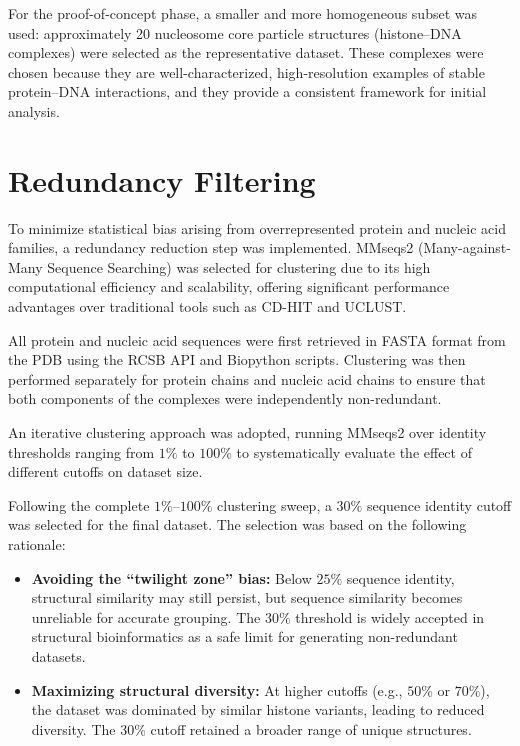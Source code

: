 \documentclass[12pt,a4paper]{report}
\begin{document}
For the proof-of-concept phase, a smaller and more homogeneous subset was used: approximately 20 nucleosome core particle structures (histone--DNA complexes) were selected as the representative dataset. These complexes were chosen because they are well-characterized, high-resolution examples of stable protein--DNA interactions, and they provide a consistent framework for initial analysis.

\newpage
\section*{Redundancy Filtering}


To minimize statistical bias arising from overrepresented protein and nucleic acid families, a redundancy reduction step was implemented. MMseqs2 (Many-against-Many Sequence Searching) was selected for clustering due to its high computational efficiency and scalability, offering significant performance advantages over traditional tools such as CD-HIT and UCLUST.

All protein and nucleic acid sequences were first retrieved in FASTA format from the PDB using the RCSB API and Biopython scripts. Clustering was then performed separately for protein chains and nucleic acid chains to ensure that both components of the complexes were independently non-redundant.

An iterative clustering approach was adopted, running MMseqs2 over identity thresholds ranging from $1\%$ to $100\%$ to systematically evaluate the effect of different cutoffs on dataset size. 

Following the complete $1\%$--$100\%$ clustering sweep, a $30\%$ sequence identity cutoff was selected for the final dataset. The selection was based on the following rationale:
\begin{itemize}
    \item \textbf{Avoiding the ``twilight zone'' bias:} Below $25\%$ sequence identity, structural similarity may still persist, but sequence similarity becomes unreliable for accurate grouping. The $30\%$ threshold is widely accepted in structural bioinformatics as a safe limit for generating non-redundant datasets.
    \item \textbf{Maximizing structural diversity:} At higher cutoffs (e.g., $50\%$ or $70\%$), the dataset was dominated by similar histone variants, leading to reduced diversity. The $30\%$ cutoff retained a broader range of unique structures.
\end{itemize}
\end{document}
